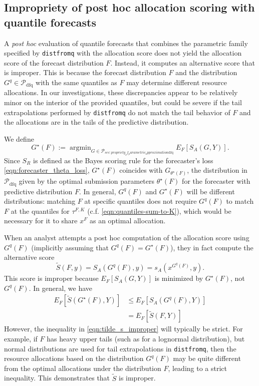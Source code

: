 \documentclass{article}\usepackage[]{graphicx}\usepackage[]{xcolor}
\DeclareMathOperator*{\argmin}{argmin}
\begin{document}
\subsection{Impropriety of post hoc allocation scoring with quantile forecasts}

A \emph{post hoc} evaluation of quantile forecasts that combines the parametric family specified by \verb`distfromq`
with the allocation score does not yield the allocation score of the forecast distribution $F$. Instead, it computes an
alternative score that is improper. This is because the forecast distribution $F$ and the distribution $G^q \in
\mathcal{P}_{\text{dfq}}$ with the same quantiles as $F$ may determine different resource allocations. In our
investigations, these discrepancies appear to be relatively minor on the interior of the provided quantiles, but could
be severe if the tail extrapolations performed by \verb`distfromq` do not match the tail behavior of $F$ and the
allocations are in the tails of the predictive distribution.

We define
$$G^{\star}(F) := \argmin_{G \in \mathcal{P}_{sec:propriety_of_parametric_approximation\mathrm{dfq}}} E_{F}[S_A(G, Y)].$$
Since $S_R$ is defined as the Bayes scoring rule for the forecaster's loss \eqref{eqn:forecaster_theta_loss}, $G^{\star}(F)$ coincides
with $G_{\theta^{\star}(F)}$, the distribution in $\mathcal{P}_{\mathrm{dfq}}$ given by the
optimal submission parameters $\theta^{\star}(F)$ for the forecaster with predictive distribution $F$.
In general, $G^q(F)$ and $G^\star(F)$ will be different distributions:  matching $F$ at specific quantiles
does not require $G^q(F)$ to match $F$ at the quantiles for $\tau^{F,K}$ (c.f. \eqref{eqn:quantiles-sum-to-K}),
which would be necessary for it to share $x^F$ as an optimal allocation.

When an analyst attempts a post hoc computation of the allocation score using $G^q(F)$ (implicitly assuming that $G^q(F)
= G^\star(F)$), they in fact compute the alternative score
$$\tilde{S}(F, y) = S_A(G^q(F), y) = s_A(x^{G^q(F)}, y).$$
This score is improper because $E_{F}[S_A(G, Y)]$ is minimized by $G^\star(F)$, not $G^q(F)$.
In general, we have
\begin{align}
E_{F}[\tilde{S}(G^\star(F), Y)] &\leq E_{F}[ S_A(G^q(F), Y) ] \label{eqn:tilde_s_improper} \\
  &= E_{F}[\tilde{S}(F, Y)] \nonumber
\end{align}
However, the inequality in \eqref{eqn:tilde_s_improper} will typically be strict. For example, if $F$ has heavy upper
tails (such as for a lognormal distribution), but normal distributions are used for tail extrapolations in
\verb`distfromq`, then the resource allocations based on the distribution $G^q(F)$ may be quite different from the
optimal allocations under the distribution $F$, leading to a strict inequality. This demonstrates that $\tilde{S}$ is
improper.


\end{document}
